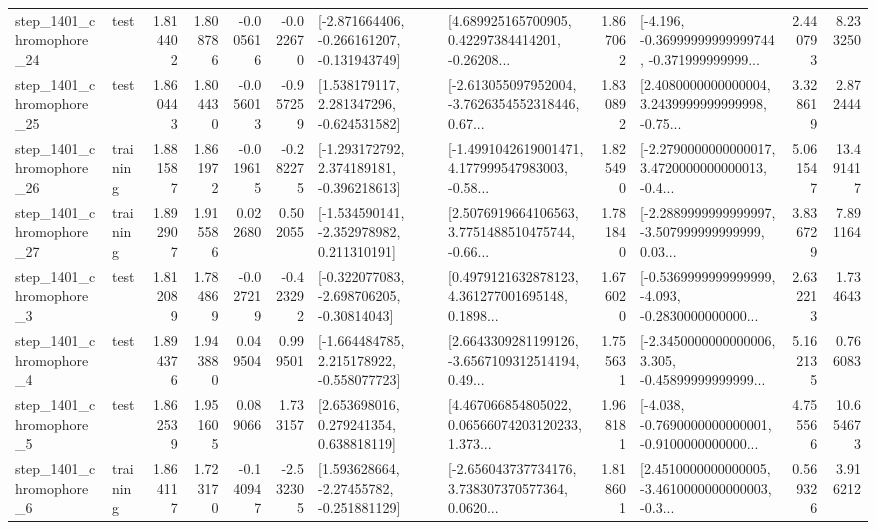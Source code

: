 \begin{tabular}{llrrrrllrlrr}
 step\_1401\_chromophore\_24 &      test &      1.814402 &    1.808786 &     -0.005616 & -0.022670 &  [-2.871664406, -0.266161207, -0.131943749] &  [4.689925165700905, 0.42297384414201, -0.26208... &       1.867062 &  [-4.196, -0.36999999999999744, -0.371999999999... &            2.440793 &          8.233250 \\
 step\_1401\_chromophore\_25 &      test &      1.860443 &    1.804430 &     -0.056013 & -0.957259 &    [1.538179117, 2.281347296, -0.624531582] &  [-2.613055097952004, -3.7626354552318446, 0.67... &       1.830892 &  [2.4080000000000004, 3.2439999999999998, -0.75... &            3.328619 &          2.872444 \\
 step\_1401\_chromophore\_26 &  training &      1.881587 &    1.861972 &     -0.019615 & -0.282275 &   [-1.293172792, 2.374189181, -0.396218613] &  [-1.4991042619001471, 4.177999547983003, -0.58... &       1.825490 &  [-2.2790000000000017, 3.4720000000000013, -0.4... &            5.061547 &         13.491417 \\
 step\_1401\_chromophore\_27 &  training &      1.892907 &    1.915586 &      0.022680 &  0.502055 &   [-1.534590141, -2.352978982, 0.211310191] &  [2.5076919664106563, 3.7751488510475744, -0.66... &       1.781840 &  [-2.2889999999999997, -3.507999999999999, 0.03... &            3.836729 &          7.891164 \\
  step\_1401\_chromophore\_3 &      test &      1.812089 &    1.784869 &     -0.027219 & -0.423292 &   [-0.322077083, -2.698706205, -0.30814043] &  [0.4979121632878123, 4.361277001695148, 0.1898... &       1.676020 &  [-0.5369999999999999, -4.093, -0.2830000000000... &            2.632213 &          1.734643 \\
  step\_1401\_chromophore\_4 &      test &      1.894376 &    1.943880 &      0.049504 &  0.999501 &   [-1.664484785, 2.215178922, -0.558077723] &  [2.6643309281199126, -3.6567109312514194, 0.49... &       1.755631 &  [-2.3450000000000006, 3.305, -0.45899999999999... &            5.162135 &          0.766083 \\
  step\_1401\_chromophore\_5 &      test &      1.862539 &    1.951605 &      0.089066 &  1.733157 &     [2.653698016, 0.279241354, 0.638818119] &  [4.467066854805022, 0.06566074203120233, 1.373... &       1.968181 &  [-4.038, -0.7690000000000001, -0.9100000000000... &            4.755566 &         10.654673 \\
  step\_1401\_chromophore\_6 &  training &      1.864117 &    1.723170 &     -0.140947 & -2.532305 &    [1.593628664, -2.27455782, -0.251881129] &  [-2.656043737734176, 3.738307370577364, 0.0620... &       1.818601 &  [2.4510000000000005, -3.4610000000000003, -0.3... &            0.569326 &          3.916212 \\

\end{tabular}

